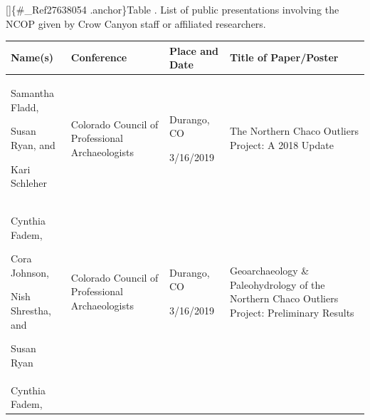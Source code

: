 \documentclass[
  12pt,
]{krantz}
\begin{document}
{[}{]}\{\#\_Ref27638054 .anchor\}Table . List of public presentations involving
the NCOP given by Crow Canyon staff or affiliated researchers.

\begin{longtable}[]{@{}llll@{}}
\toprule
\begin{minipage}[b]{0.21\columnwidth}\raggedright
Name(s)\strut
\end{minipage} & \begin{minipage}[b]{0.21\columnwidth}\raggedright
Conference\strut
\end{minipage} & \begin{minipage}[b]{0.21\columnwidth}\raggedright
Place and Date\strut
\end{minipage} & \begin{minipage}[b]{0.21\columnwidth}\raggedright
Title of
Paper/Poster\strut
\end{minipage}\tabularnewline
\midrule
\endhead
\begin{minipage}[t]{0.21\columnwidth}\raggedright
Samantha
Fladd,

Susan Ryan,
and

Kari Schleher\strut
\end{minipage} & \begin{minipage}[t]{0.21\columnwidth}\raggedright
Colorado
Council of
Professional
Archaeologists\strut
\end{minipage} & \begin{minipage}[t]{0.21\columnwidth}\raggedright
Durango, CO

3/16/2019\strut
\end{minipage} & \begin{minipage}[t]{0.21\columnwidth}\raggedright
The Northern
Chaco Outliers
Project: A
2018 Update\strut
\end{minipage}\tabularnewline
\begin{minipage}[t]{0.21\columnwidth}\raggedright
Cynthia Fadem,

Cora Johnson,

Nish Shrestha,
and

Susan Ryan\strut
\end{minipage} & \begin{minipage}[t]{0.21\columnwidth}\raggedright
Colorado
Council of
Professional
Archaeologists\strut
\end{minipage} & \begin{minipage}[t]{0.21\columnwidth}\raggedright
Durango, CO

3/16/2019\strut
\end{minipage} & \begin{minipage}[t]{0.21\columnwidth}\raggedright
Geoarchaeology
\&
Paleohydrology
of the
Northern Chaco
Outliers
Project:
Preliminary
Results\strut
\end{minipage}\tabularnewline
\begin{minipage}[t]{0.21\columnwidth}\raggedright
Cynthia Fadem,


\end{minipage}
\end{longtable}
\end{document}
